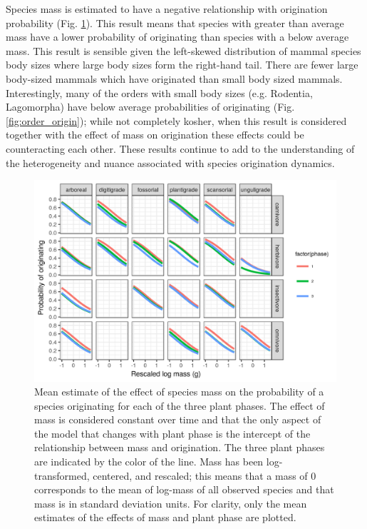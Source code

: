 \documentclass[12pt,letterpaper]{article}
\begin{document}
Species mass is estimated to have a negative relationship with origination probability (Fig. \ref{fig:mass_origin}). This result means that species with greater than average mass have a lower probability of originating than species with a below average mass. This result is sensible given the left-skewed distribution of mammal species body sizes where large body sizes form the right-hand tail. There are fewer large body-sized mammals which have originated than small body sized mammals. Interestingly, many of the orders with small body sizes (e.g. Rodentia, Lagomorpha) have below average probabilities of originating (Fig. \ref{fig:order_origin}); while not completely kosher, when this result is considered together with the effect of mass on origination these effects could be counteracting each other. These results continue to add to the understanding of the heterogeneity and nuance associated with species origination dynamics.
\begin{figure}[ht]
  \centering
  \includegraphics[width=\textwidth,height=0.4\textheight,keepaspectratio=true]{figure/mass_on_origin_bd}
  \caption[Effect of mass on probability of species origination as estimated from the birth-death model]{Mean estimate of the effect of species mass on the probability of a species originating for each of the three plant phases. The effect of mass is considered constant over time and that the only aspect of the model that changes with plant phase is the intercept of the relationship between mass and origination. The three plant phases are indicated by the color of the line. Mass has been log-transformed, centered, and rescaled; this means that a mass of 0 corresponds to the mean of log-mass of all observed species and that mass is in standard deviation units. For clarity, only the mean estimates of the effects of mass and plant phase are plotted.}
  \label{fig:mass_origin}
\end{figure}
\end{document}
